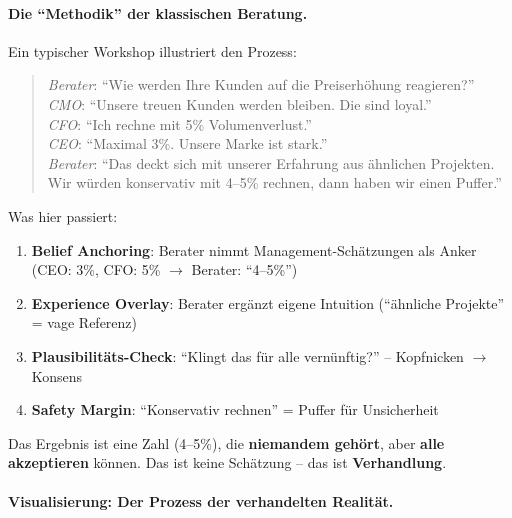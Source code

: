\paragraph{Die ``Methodik'' der klassischen Beratung.}
Ein typischer Workshop illustriert den Prozess:

\begin{quote}
\textit{Berater}: ``Wie werden Ihre Kunden auf die Preiserhöhung reagieren?''\\
\textit{CMO}: ``Unsere treuen Kunden werden bleiben. Die sind loyal.''\\
\textit{CFO}: ``Ich rechne mit 5\% Volumenverlust.''\\
\textit{CEO}: ``Maximal 3\%. Unsere Marke ist stark.''\\[0.5em]
\textit{Berater}: ``Das deckt sich mit unserer Erfahrung aus ähnlichen Projekten. Wir würden konservativ mit 4--5\% rechnen, dann haben wir einen Puffer.''
\end{quote}

Was hier passiert:
\begin{enumerate}
    \item \textbf{Belief Anchoring}: Berater nimmt Management-Schätzungen als Anker (CEO: 3\%, CFO: 5\% $\rightarrow$ Berater: ``4--5\%'')
    \item \textbf{Experience Overlay}: Berater ergänzt eigene Intuition (``ähnliche Projekte'' = vage Referenz)
    \item \textbf{Plausibilitäts-Check}: ``Klingt das für alle vernünftig?'' -- Kopfnicken $\rightarrow$ Konsens
    \item \textbf{Safety Margin}: ``Konservativ rechnen'' = Puffer für Unsicherheit
\end{enumerate}

Das Ergebnis ist eine Zahl (4--5\%), die \textbf{niemandem gehört}, aber \textbf{alle akzeptieren} können. Das ist keine Schätzung -- das ist \textbf{Verhandlung}.

\paragraph{Visualisierung: Der Prozess der verhandelten Realität.}

